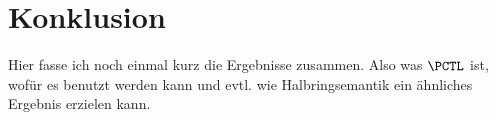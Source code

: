 \section{Konklusion}

Hier fasse ich noch einmal kurz die Ergebnisse zusammen. Also was $\PCTL$ ist, wofür es benutzt werden kann und evtl. wie Halbringsemantik ein ähnliches Ergebnis erzielen kann.